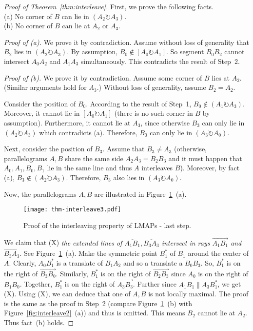 \documentclass{ws-ijcga}
\begin{document}
\begin{proof}[Proof of Theorem~\ref{thm:interleave}]
\smallskip First, we prove the following facts.\\
(a) No corner of $B$ can lie in $(A_2\circlearrowright A_3)$.\\
(b) No corner of $B$ can lie at $A_2$ or $A_3$.

\smallskip \noindent \emph{Proof of (a).} We prove it by contradiction.
    Assume without loss of generality that $B_2$ lies in $(A_2\circlearrowright A_3)$.
By assumption, $B_0\notin [A_0\circlearrowright A_1]$. So segment $B_0B_2$ cannot intersect $A_0A_2$ and $A_1A_3$ simultaneously.
This contradicts the result of Step~2.

\smallskip \noindent \emph{Proof of (b).} We prove it by contradiction.
    Assume some corner of $B$ lies at $A_2$. (Similar arguments hold for $A_3$.)
Without loss of generality, assume $B_2=A_2$.

Consider the position of $B_0$. According to the result of Step~1, $B_0\notin (A_1\circlearrowright A_3)$.
Moreover, it cannot lie in $[A_0\circlearrowright A_1]$ (there is no such corner in $B$ by assumption).
Furthermore, it cannot lie at $A_3$, since otherwise $B_3$ can only lie in $(A_2\circlearrowright A_3)$ which contradicts (a).
Therefore, $B_0$ can only lie in $(A_3\circlearrowright A_0)$.

Next, consider the position of $B_3$. Assume that $B_3\neq A_3$ (otherwise, parallelograms $A,B$ share the same side $A_2A_3=B_2B_3$
    and it must happen that $A_0,A_1,B_0,B_1$ lie in the same line and thus $A$ interleaves $B$).
  Moreover, by fact (a), $B_3\notin (A_2\circlearrowright A_3)$.
  Therefore, $B_3$ also lies in $(A_3\circlearrowright A_0)$.

Now, the parallelograms $A,B$ are illustrated in Figure~\ref{fig:interleave3}~(a).

\begin{figure}[h]
\centering\texttt{[image: thm-interleave3.pdf]}
\caption{Proof of the interleaving property of LMAPs - last step.}\label{fig:interleave3}
\end{figure}

\smallskip We claim that (X) \emph{the extended lines of $\overline{A_1B_1},\overline{B_3A_3}$ intersect in rays $\overrightarrow{A_1B_1}$ and $\overrightarrow{B_3A_3}$}.
See Figure~\ref{fig:interleave3}~(a). Make the symmetric point $B^*_1$ of $B_1$ around the center of $A$.
Clearly, $A_0B^*_1$ is a translate of $B_1A_2$ and so a translate a $B_0B_3$.
So, $B^*_1$ is on the right of $\overrightarrow{B_3B_0}$.
Similarly, $B^*_1$ is on the right of $\overrightarrow{B_2B_3}$ since $A_0$ is on the right of $\overrightarrow{B_1B_0}$.
Together, $B^*_1$ is on the right of $\overrightarrow{A_3B_3}$. Further since $A_1B_1\parallel A_3B^*_1$, we get (X).
Using (X), we can deduce that one of $A,B$ is not locally maximal.
The proof is the same as the proof in Step~2 (compare Figure~\ref{fig:interleave3}~(b) with Figure~\ref{fig:interleave2}~(a)) and thus is omitted.
This means $B_2$ cannot lie at $A_2$. Thus fact~(b) holds.


\end{proof}
\end{document}
